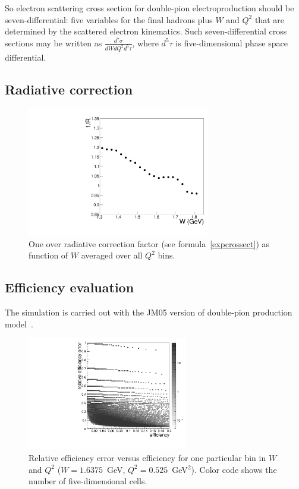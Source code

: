 \documentclass[prc,twocolumn,superscriptaddress,showpacs,amssymb,amsmath,amsfonts,linenumbers,aps]{revtex4-1}
\begin{document}
So
electron scattering cross section for double-pion electroproduction should be
seven-differential: five variables for the final
hadrons plus $W$ and $Q^{2}$ that are determined by the
scattered electron kinematics. Such
seven-differential cross sections may be
written as
$\frac{d^{7}\sigma}{dWdQ^{2}d^{5}\tau}$,
where $d^{5}\tau$ is five-dimensional phase space differential.


\subsection{Radiative correction}

\begin{figure}[htp]
\begin{center}
\includegraphics[width=8cm]{pictures/rad_corr/rad_corr_avrg.pdf}
\caption{\small One over radiative correction factor (see formula~\ref{expcrossect})
as function of $W$ averaged over all  $Q^{2}$ bins.} \label{radcorrfact}
\end{center}
\end{figure}


\subsection{Efficiency evaluation}

The simulation is carried out with the JM05 version of double-pion production model~\cite{Ripani:2000va,Aznauryan:2005tp,Mokeev:2005re}.


\begin{figure}[htp]
\begin{center}
\includegraphics[width=7cm]{pictures/efficiency/eff_err.pdf}
\caption{\small Relative efficiency error versus efficiency for one particular bin in $W$ and $Q^2$ ($W = 1.6375$~GeV, $Q^2 = 0.525$~GeV$^2$). Color code shows the number of five-dimensional cells.} \label{fig:eff_err}
\end{center}
\end{figure}
\end{document}
